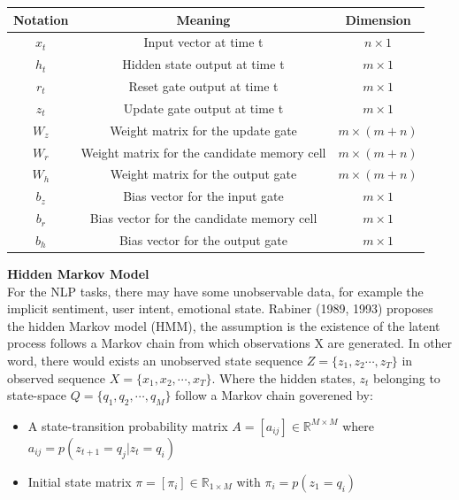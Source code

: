 \documentclass[12pt,a4paper]{article}
\begin{document}
\begin{longtable}{|c|c|c|}
    \hline
    \textbf{Notation} & \textbf{Meaning} & \textbf{Dimension}\\
    \hline
    $x_t$               & Input vector at time t                        & $n \times 1$\\
    $h_t$               & Hidden state output at time t                 & $m \times 1$\\
    $r_t$               & Reset gate output at time t                   & $m \times 1$\\
    $z_t$               & Update gate output at time t                  & $m \times 1$\\
    $W_z$               & Weight matrix for the update gate             & $m \times (m+n)$\\
    $W_r$               & Weight matrix for the candidate memory cell   & $m \times (m+n)$\\
    $W_h$               & Weight matrix for the output gate             & $m \times (m+n)$\\
    $b_z$               & Bias vector for the input gate                & $m \times 1$\\
    $b_r$               & Bias vector for the candidate memory cell     & $m \times 1$\\
    $b_h$               & Bias vector for the output gate               & $m \times 1$\\
    \hline
\end{longtable}

\newpage
\textbf{Hidden Markov Model}
\\[1ex]
For the NLP tasks, there may have some unobservable data, for example the implicit sentiment, user intent, emotional state. Rabiner (1989, 1993) proposes the hidden Markov model (HMM), the assumption is the existence of the latent process follows a Markov chain from which observations X are generated. In other word, there would exists an unobserved state sequence $Z = \{z_1, z_2 \cdots , z_T\}$ in observed sequence $X = \{x_1, x_2, \cdots, x_T\}$. Where the hidden states, $z_t$ belonging to state-space $Q = \{q_1, q_2, \cdots, q_M \}$ follow a Markov chain goverened by: 
\begin{itemize}
    \item A state-transition probability matrix $A = [a_{ij}] \in \mathbb{R}^{M \times M}$ where $a_{ij} = p(z_{t+1} = q_j | z_t = q_i)$ 
\end{itemize}
\begin{itemize}
    \item Initial state matrix $\pi = [\pi_i] \in \mathbb{R}_{1 \times M}$ with $\pi_i = p(z_1 = q_i)$
\end{itemize}
\end{document}
